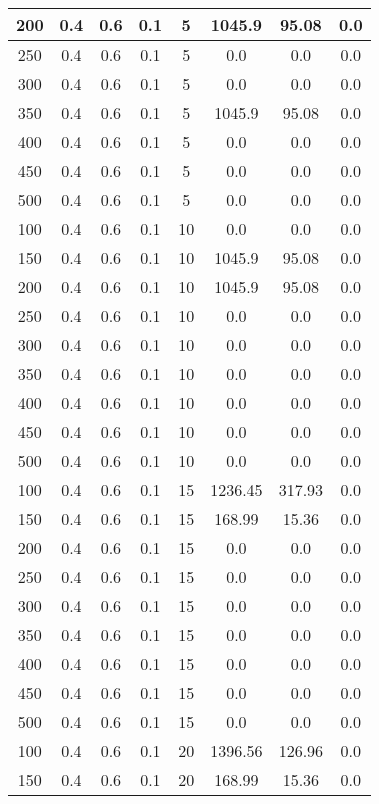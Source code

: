 \documentclass[a4paper, 12pt]{extreport}
\begin{document}
\begin{itemize}
\begin{longtable}{|c|c|c|c|c|c|c|c|}
			200 & 0.4 & 0.6 & 0.1 & 5 & 1045.9 & 95.08 & 0.0 \\\hline
			250 & 0.4 & 0.6 & 0.1 & 5 & 0.0 & 0.0 & 0.0 \\\hline
			300 & 0.4 & 0.6 & 0.1 & 5 & 0.0 & 0.0 & 0.0 \\\hline
			350 & 0.4 & 0.6 & 0.1 & 5 & 1045.9 & 95.08 & 0.0 \\\hline
			400 & 0.4 & 0.6 & 0.1 & 5 & 0.0 & 0.0 & 0.0 \\\hline
			450 & 0.4 & 0.6 & 0.1 & 5 & 0.0 & 0.0 & 0.0 \\\hline
			500 & 0.4 & 0.6 & 0.1 & 5 & 0.0 & 0.0 & 0.0 \\\hline
			100 & 0.4 & 0.6 & 0.1 & 10 & 0.0 & 0.0 & 0.0 \\\hline
			150 & 0.4 & 0.6 & 0.1 & 10 & 1045.9 & 95.08 & 0.0 \\\hline
			200 & 0.4 & 0.6 & 0.1 & 10 & 1045.9 & 95.08 & 0.0 \\\hline
			250 & 0.4 & 0.6 & 0.1 & 10 & 0.0 & 0.0 & 0.0 \\\hline
			300 & 0.4 & 0.6 & 0.1 & 10 & 0.0 & 0.0 & 0.0 \\\hline
			350 & 0.4 & 0.6 & 0.1 & 10 & 0.0 & 0.0 & 0.0 \\\hline
			400 & 0.4 & 0.6 & 0.1 & 10 & 0.0 & 0.0 & 0.0 \\\hline
			450 & 0.4 & 0.6 & 0.1 & 10 & 0.0 & 0.0 & 0.0 \\\hline
			500 & 0.4 & 0.6 & 0.1 & 10 & 0.0 & 0.0 & 0.0 \\\hline
			100 & 0.4 & 0.6 & 0.1 & 15 & 1236.45 & 317.93 & 0.0 \\\hline
			150 & 0.4 & 0.6 & 0.1 & 15 & 168.99 & 15.36 & 0.0 \\\hline
			200 & 0.4 & 0.6 & 0.1 & 15 & 0.0 & 0.0 & 0.0 \\\hline
			250 & 0.4 & 0.6 & 0.1 & 15 & 0.0 & 0.0 & 0.0 \\\hline
			300 & 0.4 & 0.6 & 0.1 & 15 & 0.0 & 0.0 & 0.0 \\\hline
			350 & 0.4 & 0.6 & 0.1 & 15 & 0.0 & 0.0 & 0.0 \\\hline
			400 & 0.4 & 0.6 & 0.1 & 15 & 0.0 & 0.0 & 0.0 \\\hline
			450 & 0.4 & 0.6 & 0.1 & 15 & 0.0 & 0.0 & 0.0 \\\hline
			500 & 0.4 & 0.6 & 0.1 & 15 & 0.0 & 0.0 & 0.0 \\\hline
			100 & 0.4 & 0.6 & 0.1 & 20 & 1396.56 & 126.96 & 0.0 \\\hline
			150 & 0.4 & 0.6 & 0.1 & 20 & 168.99 & 15.36 & 0.0 \\\hline

\end{longtable}
\end{itemize}
\end{document}
